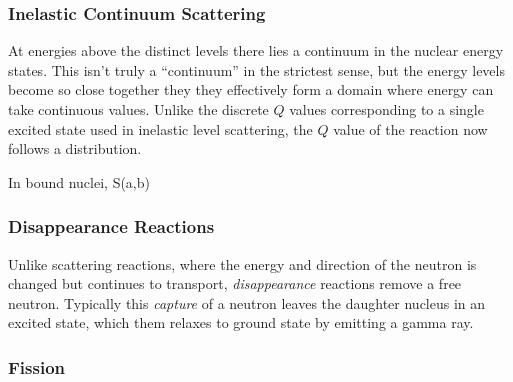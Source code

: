 \subsubsection{Inelastic Continuum Scattering}

At energies above the distinct levels there lies a continuum in the nuclear energy states.  This isn't truly a ``continuum'' in the strictest sense, but the energy levels become so close together they they effectively form a domain where energy can take continuous values.  Unlike the discrete $Q$ values corresponding to a single excited state used in inelastic level scattering, the $Q$ value of the reaction now follows a distribution.  

In bound nuclei, S(a,b)

\subsubsection{Disappearance Reactions}

Unlike scattering reactions, where the energy and direction of the neutron is changed but continues to transport, \emph{disappearance} reactions remove a free neutron.  Typically this \emph{capture} of a neutron leaves the daughter nucleus in an excited state, which them relaxes to ground state by emitting a gamma ray.


\subsubsection{Fission}

